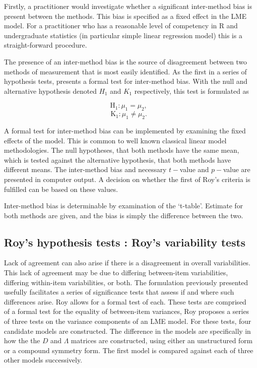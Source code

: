 \documentclass[12pt, a4paper]{report}
\theoremstyle{plain}
\theoremstyle{definition}
\theoremstyle{remark}
\begin{document}
	Firstly, a practitioner would investigate whether a significant inter-method bias is present between the methods. This bias is specified as a fixed effect in the LME model.  For a practitioner who has a reasonable level of competency in R and undergraduate statistics (in particular simple linear regression model) this is a straight-forward procedure.
	
	The presence of an inter-method bias is the source of disagreement between two methods of measurement that is most easily identified. As the first in a series of hypothesis tests, \citet{ARoy2009} presents a formal test for inter-method bias. With the null and alternative hypothesis denoted $H_1$ and $K_1$ respectively, this test is formulated as
	
	\[	\operatorname{H_1} : \mu_1 = \mu_2 ,\]
	\[	\operatorname{K_1} : \mu_1 \neq \mu_2.\]
	
	
	
	
	A formal test for inter-method bias can be implemented by examining the fixed effects of the model. This is common to well known classical linear model methodologies. The null hypotheses, that both methods have the same mean, which is tested against the alternative hypothesis, that both methods have different means.
	The inter-method bias and necessary $t-$value and $p-$value are presented in computer output. A decision on whether the first of Roy's criteria is fulfilled can be based on these values.
	
	
	Inter-method bias is determinable by examination of the `t-table'. Estimate for both methods are given, and the bias is simply the difference between the two. 
	
	
	\subsection{Roy's hypothesis tests : Roy's variability tests}
	
	Lack of agreement can also arise if there is a disagreement in overall variabilities. This lack of agreement may be due to differing between-item variabilities, differing within-item variabilities, or both. The formulation previously presented usefully facilitates a series of significance tests that assess if and where such differences arise. Roy allows for a formal test of each. These tests are comprised of a formal test for the equality of between-item variances,
	Roy proposes a series of three tests on the variance components of an LME model. For these tests, four candidate models are constructed. The difference in the models are specifically in how the the $D$ and $\Lambda$ matrices are constructed, using either an unstructured form or a compound symmetry form. The first model is compared against each of three other models successively.
	
\end{document}
